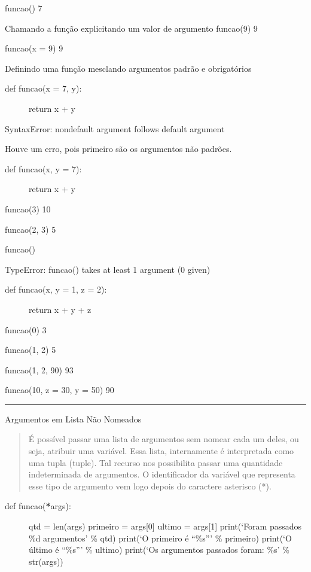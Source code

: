 \documentclass[letterpaper,10pt,brazil]{sphinxmanual}
\begin{document}
funcao()
7

Chamando a função explicitando um valor de argumento
funcao(9)
9

funcao(x = 9)
9

Definindo uma função mesclando argumentos padrão e obrigatórios
\begin{description}
\item[{def funcao(x = 7, y):}] \leavevmode
return x + y

\end{description}

SyntaxError: non\sphinxhyphen{}default argument follows default argument

Houve um erro, pois primeiro são os argumentos não padrões.
\begin{description}
\item[{def funcao(x, y = 7):}] \leavevmode
return x + y

\end{description}

funcao(3)
10

funcao(2, 3)
5

funcao()

TypeError: funcao() takes at least 1 argument (0 given)
\begin{description}
\item[{def funcao(x, y = 1, z = 2):}] \leavevmode
return x + y + z

\end{description}

funcao(0)
3

funcao(1, 2)
5

funcao(1, 2, 90)
93

funcao(10, z = 30, y = 50)
90


\bigskip\hrule\bigskip


Argumentos em Lista Não Nomeados
\begin{quote}

É possível passar uma lista de argumentos sem nomear cada um deles, ou seja, atribuir uma variável.
Essa lista, internamente é interpretada como uma tupla (tuple).
Tal recurso nos possibilita passar uma quantidade indeterminada de argumentos.
O identificador da variável que representa esse tipo de argumento vem logo depois do caractere asterisco (*).
\end{quote}
\begin{description}
\item[{def funcao({\color{red}\bfseries{}*}args):}] \leavevmode
qtd = len(args)
primeiro = args{[}0{]}
ultimo = args{[}\sphinxhyphen{}1{]}
print(‘Foram passados \%d argumentos’ \% qtd)
print(‘O primeiro é “\%s”’ \% primeiro)
print(‘O último é “\%s”’ \% ultimo)
print(‘Os argumentos passados foram: \%s’ \% str(args))

\end{description}
\end{document}
